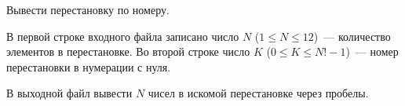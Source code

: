     Вывести перестановку по номеру.

\InputFile
В первой строке входного файла записано число $N$ ($1 \leqslant N \leqslant 12$)~--- количество элементов в перестановке.
Во второй строке число $K$ ($0 \leqslant K \leqslant N! - 1$)~--- номер перестановки в нумерации с нуля.

\OutputFile
В выходной файл вывести $N$ чисел в искомой перестановке через пробелы.

